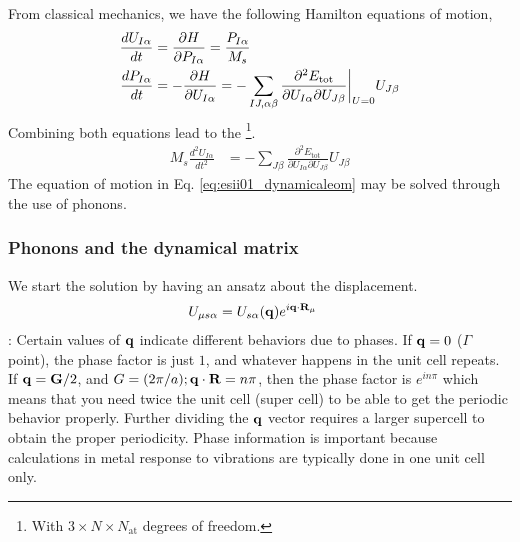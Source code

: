 From classical mechanics, we have the following Hamilton equations of motion,
\begin{align}
    \frac{dU_{I\alpha}}{dt} &= \frac{\partial H}{\partial P_{I\alpha}} = \frac{P_{I\alpha}}{M_s} \label{eq:esii01_hamilton1} \\
    \frac{dP_{I\alpha}}{dt} &= -\frac{\partial H}{\partial U_{I\alpha}} = -\sum_{IJ,\alpha\beta} \frac{\partial^2 E_\text{tot}}{\partial U_{I\alpha}\partial U_{J\beta}}\biggr\rvert_{U=0}U_{J\beta} \label{eq:esii01_hamilton2} 
\end{align}
Combining both equations lead to the \footnote{With $3\times N\times N_\text{at}$ degrees of freedom.}.
\begin{align}
    M_s\frac{d^2U_{I\alpha}}{dt^2} &= -\sum_{J\beta} \frac{\partial^2E_\text{tot}}{\partial U_{I\alpha}\partial U_{J\beta}} U_{J\beta} \label{eq:esii01_dynamicaleom}
\end{align}
The equation of motion in Eq. \ref{eq:esii01_dynamicaleom} may be solved through the use of phonons. 

\subsubsection{Phonons and the dynamical matrix}
We start the solution by having an ansatz about the displacement.
\begin{align}
    U_{\mu s\alpha} &= U_{s\alpha}(\mathbf{q})e^{i\mathbf{q}\cdot\mathbf{R}_\mu}
\end{align}
: Certain values of $\mathbf{q}$ indicate different behaviors due to phases. If $\mathbf{q}=0$ ($\Gamma$ point), the phase factor is just $1$, and whatever happens in the unit cell repeats. If $\mathbf{q}=\mathbf{G}/2$, and $G=(2\pi/a); \mathbf{q}\cdot\mathbf{R} = n\pi$, then the phase factor is $e^{in\pi}$ which means that you need twice the unit cell (super cell) to be able to get the periodic behavior properly. Further dividing the $\mathbf{q}$ vector requires a larger supercell to obtain the proper periodicity. Phase information is important because calculations in metal response to vibrations are typically done in one unit cell only. 

